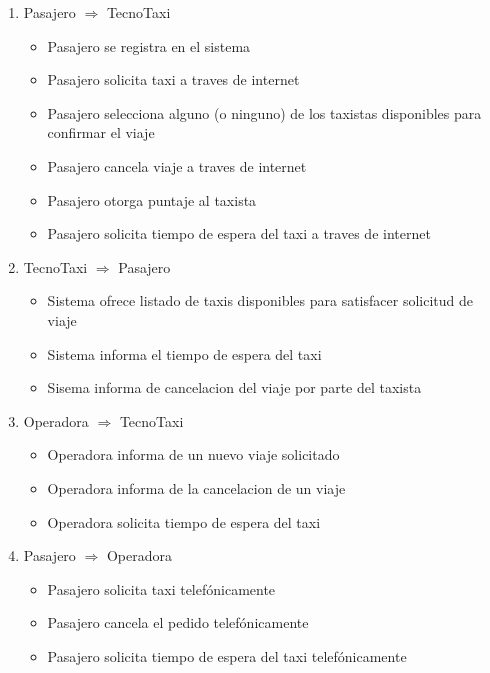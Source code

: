 \begin{enumerate}

    \item Pasajero $\Rightarrow$ TecnoTaxi
    \begin{itemize}
        \item Pasajero se registra en el sistema
        \item Pasajero solicita taxi a traves de internet
        \item Pasajero selecciona alguno (o ninguno) de los taxistas disponibles para confirmar el viaje
        \item Pasajero cancela viaje a traves de internet
        \item Pasajero otorga puntaje al taxista
        \item Pasajero solicita tiempo de espera del taxi a traves de internet
    \end{itemize}

    \item TecnoTaxi $\Rightarrow$ Pasajero
    \begin{itemize}
        \item Sistema ofrece listado de taxis disponibles para satisfacer solicitud de viaje
        \item Sistema informa el tiempo de espera del taxi 
        \item Sisema informa de cancelacion del viaje por parte del taxista
    \end{itemize}

    \item Operadora $\Rightarrow$ TecnoTaxi
    \begin{itemize}
        \item Operadora informa de un nuevo viaje solicitado
        \item Operadora informa de la cancelacion de un viaje
        \item Operadora solicita tiempo de espera del taxi
    \end{itemize}

    \item Pasajero $\Rightarrow$ Operadora
    \begin{itemize}
         \item Pasajero solicita taxi telef\'onicamente
         \item Pasajero cancela el pedido telef\'onicamente
         \item Pasajero solicita tiempo de espera del taxi telef\'onicamente
    \end{itemize}


\end{enumerate}
